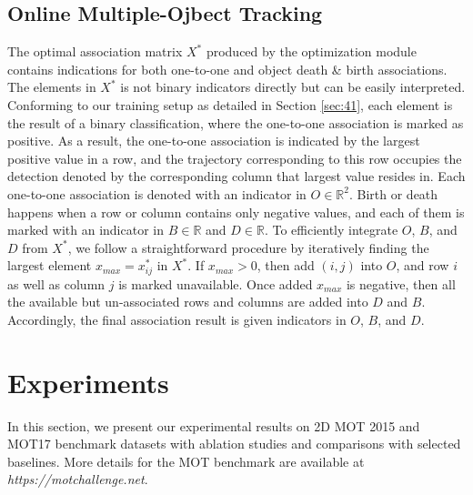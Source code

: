 \documentclass[10pt,twocolumn,letterpaper]{article}
\begin{document}
\subsection{Online Multiple-Ojbect Tracking}

The optimal association matrix $X^*$ produced by the optimization module contains indications for both one-to-one and object death \& birth associations. The elements in $X^*$ is not binary indicators directly but can be easily interpreted. Conforming to our training setup as detailed in Section \ref{sec:41}, each element is the result of a binary classification, where the one-to-one association is marked as positive. As a result, the one-to-one association is indicated by the largest positive value in a row, and the trajectory corresponding to this row occupies the detection denoted by the corresponding column that largest value resides in. Each one-to-one association is denoted with an indicator in $O\in {\mathbb{R}^{2}}$. Birth or death happens when a row or column contains only negative values, and each of them is marked with an indicator in $B\in {\mathbb{R}}$ and $D\in {\mathbb{R}}$. To efficiently integrate $O$, $B$, and $D$ from $X^{*}$, we follow a straightforward procedure by iteratively finding the largest element $x_{max} = x_{ij}^{*}$ in $X^{*}$. If $x_{max} > 0$, then add ${(i,j)}$ into $O$, and row $i$ as well as column $j$ is marked unavailable. Once added $x_{max}$ is negative, then all the available but un-associated rows and columns are added into $D$ and $B$. Accordingly, the final association result is given indicators in $O$, $B$, and $D$.


\section{Experiments}
In this section, we present our experimental results on 2D MOT 2015 \cite{mot15} and MOT17 \cite{mot16} benchmark datasets with ablation studies and comparisons with selected baselines. More details for the MOT benchmark are available at \textit{https://motchallenge.net}.
\end{document}

